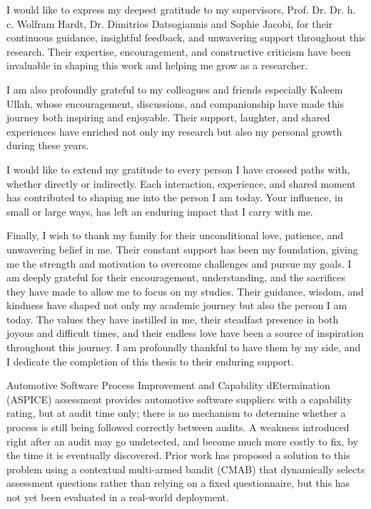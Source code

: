 \documentclass[a4paper, 12pt, oneside, openany, BCOR1cm,toc=chapterentrywithdots]{scrbook}
\begin{document}

I would like to express my deepest gratitude to my supervisors, Prof. Dr. Dr.
h. c. Wolfram Hardt, Dr. Dimitrios Datsogiannis and Sophie Jacobi, for their continuous guidance, insightful feedback, and unwavering
support throughout this research. Their expertise, encouragement, and constructive
criticism have been invaluable in shaping this work and helping me grow as a
researcher.

I am also profoundly grateful to my colleagues and friends especially Kaleem Ullah, whose encouragement,
discussions, and companionship have made this journey both inspiring and enjoyable.
Their support, laughter, and shared experiences have enriched not only my
research but also my personal growth during these years.

I would like to extend my gratitude to every person I have crossed paths with,
whether directly or indirectly. Each interaction, experience, and shared moment has
contributed to shaping me into the person I am today. Your influence, in small or
large ways, has left an enduring impact that I carry with me.

Finally, I wish to thank my family for their unconditional love, patience, and
unwavering belief in me. Their constant support has been my foundation, giving
me the strength and motivation to overcome challenges and pursue my goals. I am
deeply grateful for their encouragement, understanding, and the sacrifices they have
made to allow me to focus on my studies. Their guidance, wisdom, and kindness have
shaped not only my academic journey but also the person I am today. The values
they have instilled in me, their steadfast presence in both joyous and difficult times,
and their endless love have been a source of inspiration throughout this journey. I
am profoundly thankful to have them by my side, and I dedicate the completion of
this thesis to their enduring support.



Automotive Software Process Improvement and Capability dEtermination (ASPICE) assessment provides automotive software suppliers with a capability
rating, but at audit time only; there is no mechanism to determine whether a process is still
being followed correctly between audits. A weakness introduced right after an audit may go
undetected, and become much more costly to fix, by the time it is eventually discovered. Prior
work has proposed a solution to this problem using a contextual multi-armed bandit (CMAB) that
dynamically selects assessment questions rather than relying on a fixed questionnaire, but this
has not yet been evaluated in a real-world deployment.
\end{document}
